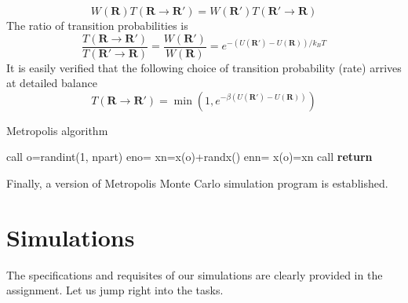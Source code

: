 \documentclass[letterpaper,12pt]{article}
\numberwithin{equation}{section}
\begin{document}
\begin{equation}
    W(\boldsymbol{R})T(\boldsymbol{R}\rightarrow\boldsymbol{R}')=W(\boldsymbol{R}')T(\boldsymbol{R}'\rightarrow\boldsymbol{R})
\end{equation}
The ratio of transition probabilities is 
\begin{equation}
    \frac{T(\boldsymbol{R}\rightarrow\boldsymbol{R}')}{T(\boldsymbol{R}'\rightarrow\boldsymbol{R})}=\frac{W(\boldsymbol{R}')}{W(\boldsymbol{R})}=e^{-(U(\boldsymbol{R}')-U(\boldsymbol{R}))/k_BT}
\end{equation}
It is easily verified that the following choice of transition probability (rate) arrives at detailed balance
\begin{equation}
    T(\boldsymbol{R}\rightarrow\boldsymbol{R}')=\min \left(1,e^{-\beta\left(U(\boldsymbol{R}')-U(\boldsymbol{R})\right)}\right)
\end{equation}
\begin{algorithm}[H]
    \caption{Metropolis algorithm}
    \begin{algorithmic}[1]
        \State call   
            \State o=randint(1, npart)  
            \State eno=  
            \State xn=x(o)+randx()    
            \State enn=  
               
                \State x(o)=xn
            \EndIf
            \State call 
        \EndFor
        \State \textbf{return}
    \end{algorithmic}
\end{algorithm}
Finally, a version of Metropolis Monte Carlo simulation program is established. 

\section{Simulations}
The specifications and requisites of our simulations are clearly provided in the assignment. Let us jump right into the tasks.
\end{document}
